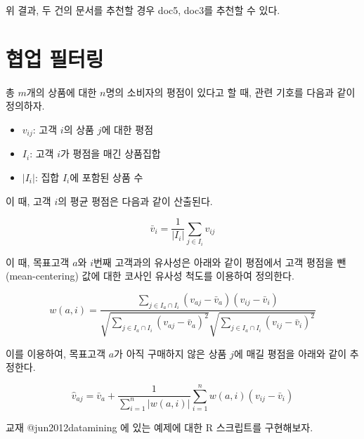 \documentclass[
]{book}
\providecommand{\tightlist}{%
  \setlength{\itemsep}{0pt}\setlength{\parskip}{0pt}}
\begin{document}
위 결과, 두 건의 문서를 추천할 경우 doc5, doc3를 추천할 수 있다.

\hypertarget{collaborative-filtering}{%
\section{협업 필터링}\label{collaborative-filtering}}

총 \(m\)개의 상품에 대한 \(n\)명의 소비자의 평점이 있다고 할 때, 관련 기호를 다음과 같이 정의하자.

\begin{itemize}
\tightlist
\item
  \(v_{ij}\): 고객 \(i\)의 상품 \(j\)에 대한 평점
\item
  \(I_i\): 고객 \(i\)가 평점을 매긴 상품집합
\item
  \(\left| I_i \right|\): 집합 \(I_i\)에 포함된 상품 수
\end{itemize}

이 때, 고객 \(i\)의 평균 평점은 다음과 같이 산출된다.

\begin{equation*}
\bar{v}_i  = \frac{1}{\left| I_i \right|} \sum_{j \in I_i} v_{ij}
\end{equation*}

이 때, 목표고객 \(a\)와 \(i\)번째 고객과의 유사성은 아래와 같이 평점에서 고객 평점을 뺀(mean-centering) 값에 대한 코사인 유사성 척도를 이용하여 정의한다.

\begin{equation*}
w(a, i) = \frac{\sum_{j \in I_a \cap I_i} (v_{aj} - \bar{v}_a) (v_{ij} - \bar{v}_i)}{\sqrt{\sum_{j \in I_a \cap I_i} (v_{aj} - \bar{v}_a)^2} \sqrt{\sum_{j \in I_a \cap I_i} (v_{ij} - \bar{v}_i)^2}}
\end{equation*}

이를 이용하여, 목표고객 \(a\)가 아직 구매하지 않은 상품 \(j\)에 매길 평점을 아래와 같이 추정한다.

\begin{equation*}
\hat{v}_{aj} = \bar{v}_a + \frac{1}{\sum_{i = 1}^{n} \left| w(a, i) \right|} \sum_{i = 1}^{n} w(a, i) (v_{ij} - \bar{v}_i)
\end{equation*}

교재 @jun2012datamining 에 있는 예제에 대한 R 스크립트를 구현해보자.
\end{document}
